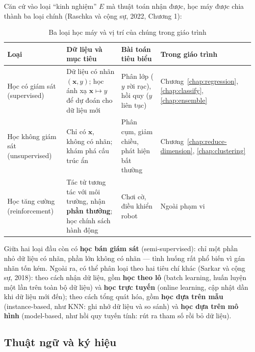 Căn cứ vào loại ``kinh nghiệm'' $E$ mà thuật toán nhận được, học máy được chia thành ba loại chính (Raschka và cộng sự, 2022, Chương 1):

\begin{table}[H]
\centering
\begin{tabular}{|p{2.8cm}|p{4.4cm}|p{3.4cm}|p{2.9cm}|}
\hline
\textbf{Loại} & \textbf{Dữ liệu và mục tiêu} & \textbf{Bài toán tiêu biểu} & \textbf{Trong giáo trình} \\
\hline
Học có giám sát (supervised) & Dữ liệu có nhãn $(\mathbf{x}, y)$; học ánh xạ $\mathbf{x} \mapsto y$ để dự đoán cho dữ liệu mới & Phân lớp ($y$ rời rạc), hồi quy ($y$ liên tục) & Chương~\ref{chap:regression}, \ref{chap:classify}, \ref{chap:ensemble} \\ \hline
Học không giám sát (unsupervised) & Chỉ có $\mathbf{x}$, không có nhãn; khám phá cấu trúc ẩn & Phân cụm, giảm chiều, phát hiện bất thường & Chương~\ref{chap:reduce-dimension}, \ref{chap:clustering} \\ \hline
Học tăng cường (reinforcement) & Tác tử tương tác với môi trường, nhận \textbf{phần thưởng}; học chính sách hành động & Chơi cờ, điều khiển robot & Ngoài phạm vi \\ \hline
\end{tabular}
\caption{Ba loại học máy và vị trí của chúng trong giáo trình}
\label{tab:ml-types}
\end{table}

Giữa hai loại đầu còn có \textbf{học bán giám sát} (semi-supervised): chỉ một phần nhỏ dữ liệu có nhãn, phần lớn không có nhãn --- tình huống rất phổ biến vì gán nhãn tốn kém. Ngoài ra, có thể phân loại theo hai tiêu chí khác (Sarkar và cộng sự, 2018): theo cách nhận dữ liệu, gồm \textbf{học theo lô} (batch learning, huấn luyện một lần trên toàn bộ dữ liệu) và \textbf{học trực tuyến} (online learning, cập nhật dần khi dữ liệu mới đến); theo cách tổng quát hóa, gồm \textbf{học dựa trên mẫu} (instance-based, như KNN: ghi nhớ dữ liệu và so sánh) và \textbf{học dựa trên mô hình} (model-based, như hồi quy tuyến tính: rút ra tham số rồi bỏ dữ liệu).

\subsection{Thuật ngữ và ký hiệu}

